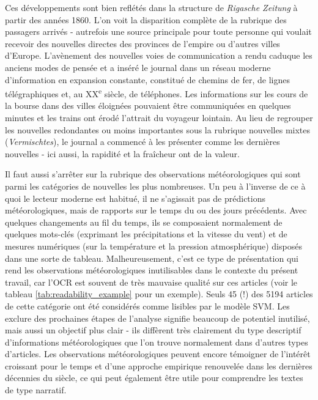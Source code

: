 \documentclass[a4paper,twoside,12pt]{article}
\begin{document}
Ces développements sont bien reflétés dans la structure de \textit{Rigasche Zeitung} à partir des années 1860. L'on voit la disparition complète de la rubrique des passagers arrivés - autrefois une source principale pour toute personne qui voulait recevoir des nouvelles directes des provinces de l'empire ou d'autres villes d'Europe. L'avènement des nouvelles voies de communication a rendu caduque les anciens modes de pensée et a inséré le journal dans un réseau moderne d'information en expansion constante, constitué de chemins de fer, de lignes télégraphiques et, au XX\textsuperscript{e} siècle, de téléphones. Les informations sur les cours de la bourse dans des villes éloignées pouvaient être communiquées en quelques minutes et les trains ont érodé l'attrait du voyageur lointain. Au lieu de regrouper les nouvelles redondantes ou moins importantes sous la rubrique \og nouvelles mixtes \fg{} (\textit{Vermischtes}), le journal a commencé à les présenter comme les \og dernières nouvelles \fg{} - ici aussi, la rapidité et la fraîcheur ont de la valeur.

Il faut aussi s'arrêter sur la rubrique des observations météorologiques qui sont parmi les catégories de nouvelles les plus nombreuses. Un peu à l'inverse de ce à quoi le lecteur moderne est habitué, il ne s'agissait pas de prédictions météorologiques, mais de rapports sur le temps du ou des jours précédents. Avec quelques changements au fil du temps, ils se composaient normalement de quelques mots-clés (exprimant les précipitations et la vitesse du vent) et de mesures numériques (sur la température et la pression atmosphérique) disposés dans une sorte de tableau. Malheureusement, c'est ce type de présentation qui rend les observations météorologiques inutilisables dans le contexte du présent travail, car l'OCR est souvent de très mauvaise qualité sur ces articles (voir le tableau \ref{tab:readability_example} pour un exemple). Seuls 45 (!) des 5194 articles de cette catégorie ont été considérés comme lisibles par le modèle SVM. Les exclure des prochaines étapes de l'analyse signifie beaucoup de potentiel inutilisé, mais aussi un objectif plus clair - ils diffèrent très clairement du type descriptif d'informations météorologiques que l'on trouve normalement dans d'autres types d'articles. Les observations météorologiques peuvent encore témoigner de l'intérêt croissant pour le temps et d'une approche empirique renouvelée dans les dernières décennies du siècle, ce qui peut également être utile pour comprendre les textes de type narratif.
\end{document}
